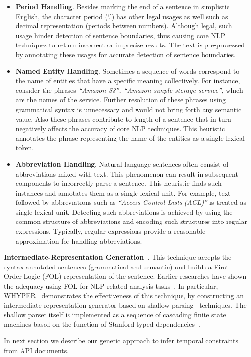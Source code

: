 \begin{itemize}

\item \textbf{Period Handling}. Besides marking the end of a sentence in simplistic English, the character period (`.') has other legal usages as well such as decimal representation (periods between numbers).
Although legal, such usage hinder detection of sentence boundaries, thus causing core NLP techniques to return incorrect or imprecise results.
The text is pre-processed by annotating these usages for accurate detection of sentence boundaries.
	
\item \textbf{Named Entity Handling}. Sometimes a sequence of words correspond to the name of entities that have a specific meaning collectively.
For instance, consider the phrases \textit{``Amazon S3'', ``Amazon simple storage service''}, which are the names of the service.
Further resolution of these phrases using grammatical syntax is unnecessary and would not bring forth any semantic value.
Also these phrases contribute to length of a sentence that in turn negatively affects the accuracy of core NLP techniques.
This heuristic annotates the phrase representing the name of the entities as a single lexical token.
	
\item \textbf{Abbreviation Handling}. Natural-language sentences often consist of abbreviations mixed with text.
This phenomenon can result in subsequent components to incorrectly parse a sentence.
This heuristic finds such instances and annotates them as a single lexical unit.
For example, text followed by abbreviations such as \textit{``Access Control Lists (ACL)''} is treated as single lexical unit.
Detecting such abbreviations is achieved by using the common structure of abbreviations and encoding such structures into regular expressions.
Typically, regular expressions provide a reasonable approximation for handling abbreviations.  

\end{itemize}

\textbf{Intermediate-Representation Generation}~\cite{pandita13:WHYPER}.
This technique accepts the syntax-annotated sentences (grammatical and semantic) and builds a First-Order-Logic (FOL) representation of the sentence.
Earlier researches have shown the adequacy using FOL for NLP related analysis tasks~\cite{Sinha2009,Sinha2010,pandita12:inferring}.
In particular, WHYPER~\cite{pandita13:WHYPER} demonstrates the effectiveness of this technique, by constructing an intermediate representation generator based on shallow parsing~\cite{Branimir2000} techniques. 
The shallow parser itself is implemented as a sequence of cascading finite state machines based on the function of Stanford-typed dependencies~\cite{Marneffe06LREC,Marneffe08COLING,Klein03,KleinNIPS03}.


In next section we describe our generic approach to infer temporal constraints from API documents. 